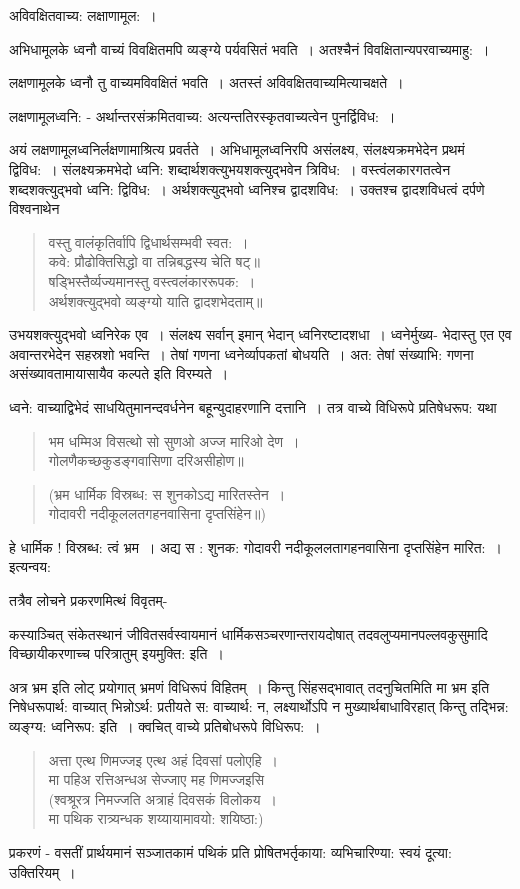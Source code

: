 {अविवक्षितवाच्य: लक्षाणामूल:~। 

अभिधामूलके ध्वनौ वाच्यं विवक्षितमपि व्यङ्ग्ये पर्यवसितं भवति~। अतश्चैनं विवक्षितान्यपरवाच्यमाहु:~। 

लक्षणामूलके ध्वनौ तु वाच्यमविवक्षितं भवति~। अतस्तं अविवक्षितवाच्यमित्याचक्षते~। 

लक्षणामूलध्वनि: - अर्थान्तरसंक्रमितवाच्य: अत्यन्ततिरस्कृतवाच्यत्वेन पुनर्द्विविध:~। 

अयं लक्षणामूलध्वनिर्लक्षणामाश्रित्य प्रवर्तते~। अभिधामूलध्वनिरपि असंलक्ष्य,  संलक्ष्यक्रमभेदेन प्रथमं द्विविध:~।  संलक्ष्यक्रमभेदो ध्वनि: शब्दार्थशक्त्युभयशक्त्युद्भवेन त्रिविध:~। वस्त्वंलकारगतत्वेन शब्दशक्त्युद्भवो ध्वनि: द्विविध:~। अर्थशक्त्युद्भवो ध्वनिश्च द्वादशविध:~। उक्तश्च द्वादशविधत्वं दर्पणे विश्वनाथेन

\begin{verse}
वस्तु वालंकृतिर्वापि द्विधार्थसम्भवी स्वत:~। \\
कवे: प्रौढोक्तिसिद्धो वा तन्निबद्धस्य चेति षट्॥\\
षड्भिस्तैर्व्यज्यमानस्तु वस्त्वलंकाररूपक:~। \\
अर्थशक्त्युद्भवो व्यङ्ग्यो याति द्वादशभेदताम्॥
\end{verse}
उभयशक्त्युद्भवो ध्वनिरेक एव~। संलक्ष्य सर्वान् इमान् भेदान् ध्वनिरष्टादशधा~। ध्वनेर्मुख्य- भेदास्तु एत एव अवान्तरभेदेन सहस्रशो भवन्ति~। तेषां गणना ध्वनेर्व्यापकतां बोधयति~। अत: तेषां संख्याभि: गणना असंख्यावतामायासायैव कल्पते इति विरम्यते~। 

ध्वने: वाच्याद्विभेदं साधयितुमानन्दवर्धनेन बहून्युदाहरणानि दत्तानि~। तत्र वाच्ये विधिरूपे प्रतिषेधरूप: यथा 
\begin{verse}
भम धम्मिअ विसत्थो सो सुणओ अज्ज मारिओ देण~। \\
गोलणैकच्छकुडङ्गवासिणा दरिअसीहोण॥
\end{verse}
\begin{verse}
(भ्रम धार्मिक विस्रब्ध: स शुनकोऽद्य मारितस्तेन~। \\
गोदावरी नदीकूललतगहनवासिना दृप्तसिंहेन॥)
\end{verse}
हे धार्मिक !  विस्रब्ध: त्वं भ्रम~। अद्य स : शुनक: गोदावरी नदीकूललतागहनवासिना दृप्तसिंहेन मारित:~। इत्यन्वय:

तत्रैव लोचने प्रकरणमित्थं विवृतम्-

कस्याञ्चित् संकेतस्थानं जीवितसर्वस्वायमानं धार्मिकसञ्चरणान्तरायदोषात् तदवलुप्यमानपल्लवकुसुमादि विच्छायीकरणाच्च परित्रातुम् इयमुक्ति: इति~। 

अत्र भ्रम इति लोट् प्रयोगात् भ्रमणं विधिरूपं विहितम्~। किन्तु सिंहसद्भावात् तदनुचितमिति मा भ्रम इति निषेधरूपार्थ: वाच्यात् भिन्नोऽर्थ: प्रतीयते स: वाच्यार्थ: न, लक्ष्यार्थोऽपि न मुख्यार्थबाधाविरहात् किन्तु तद्भिन्न: व्यङ्ग्य: ध्वनिरूप: इति~। क्वचित् वाच्ये प्रतिबोधरूपे विधिरूप:~। 
\begin{verse}
अत्ता एत्थ णिमज्जइ एत्थ अहं दिवसां पलोएहि~। \\
मा पहिअ रत्तिअन्धअ सेज्जाए मह णिमज्जइसि\\
(श्वश्रूरत्र निमज्जति अत्राहं दिवसकं विलोकय~। \\
मा पथिक रात्र्यन्धक शय्यायामावयो: शयिष्ठा:)
\end{verse}
प्रकरणं - वसतीं प्रार्थयमानं सञ्जातकामं पथिकं प्रति प्रोषितभर्तृकाया: व्यभिचारिण्या: स्वयं दूत्या: उक्तिरियम्~। 

}
